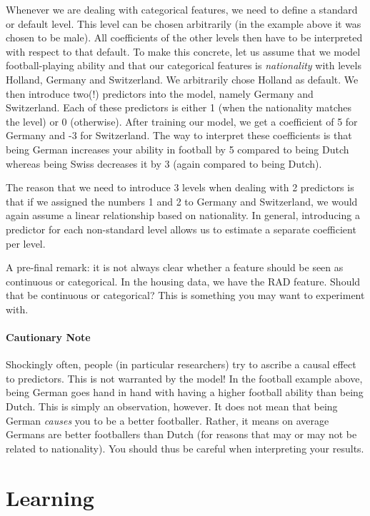 \documentclass[11pt, leqno, a4paper]{article}
\begin{document}
Whenever we are dealing with categorical features, we need to define a standard or default level. This
level can be chosen arbitrarily (in the example above it was chosen to be male). 
All coefficients of the other levels then have to be interpreted with
respect to that default. To make this concrete, let us assume that we model football-playing ability and
that our categorical features is \textit{nationality} with levels Holland, Germany and Switzerland.
We arbitrarily chose Holland as default. We then introduce two(!) predictors into the model, namely
Germany and Switzerland. Each of these predictors is either 1 (when the nationality matches the level)
or 0 (otherwise). After training our model, we get a coefficient of 5 for Germany and -3 for Switzerland.
The way to interpret these coefficients is that being German increases your ability in football by 5
compared to being Dutch whereas being Swiss decreases it by 3 (again compared to being Dutch).

The reason that we need to introduce 3 levels when dealing with 2 predictors is that if we assigned
the numbers 1 and 2 to Germany and Switzerland, we would again assume a linear relationship based on
nationality. In general, introducing a predictor for each non-standard level allows us to estimate a separate coefficient
per level.

A pre-final remark: it is not always clear whether a feature should be seen as continuous or categorical.
In the housing data, we have the RAD feature. Should that be continuous or categorical? This is
something you may want to experiment with.

\paragraph{Cautionary Note} Shockingly often, people (in particular researchers) try to ascribe 
a causal effect to predictors. This is not warranted by the model! In the football example above, being
German goes hand in hand with having a higher football ability than being Dutch. This is simply an 
observation, however. It does not mean that being German \textit{causes} you to be a better footballer.
Rather, it means on average Germans are better footballers than Dutch
(for reasons that may or may not be related to nationality). You
should thus be careful when interpreting your results.

\section{Learning}
\end{document}
